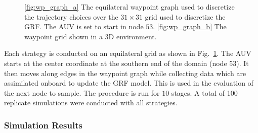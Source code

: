 \documentclass[aoas,preprint]{imsart}
\begin{document}
\begin{figure}[!b] 
\centering 
{}
\hfill
{}
\caption{\ref{fig:wp_graph_a} The equilateral waypoint graph used to discretize the
trajectory choices over the $31\times31$ grid used to discretize the GRF. The AUV is set to start in node $53$.
\ref{fig:wp_graph_b} The waypoint grid shown in a 3D environment.}
\label{fig:wp_graph}
\end{figure}

Each strategy is conducted on an equilateral grid as shown in
Fig.~\ref{fig:wp_graph}. The AUV starts at the center coordinate at
the southern end of the domain (node 53). It then moves along edges in
the waypoint graph while collecting data which are assimilated onboard
to update the GRF model. This is used in the evaluation of the next
node to sample.  The procedure is run for $10$ stages. A total of 100
replicate simulations were conducted with all strategies.

\subsubsection{Simulation Results}
\end{document}
